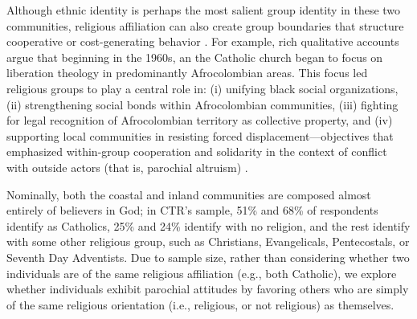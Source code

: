 \documentclass[bibauthoryear]{aa}
\begin{document}
Although ethnic identity is perhaps the most salient group identity in these two communities, religious affiliation can also create group boundaries that  structure cooperative or cost-generating behavior  \citep[e.g.,][]{lang2019moralizing, purzycki2016moralistic, hruschka2014impartial}. For example, rich qualitative accounts \citep[e.g.,][]{oyola2015religion} argue that beginning in the 1960s, an the Catholic church began to focus on liberation theology in predominantly Afrocolombian areas. This focus led religious groups to play a central role in: (i) unifying black social organizations,  (ii) strengthening social bonds within Afrocolombian communities, (iii) fighting for legal recognition of Afrocolombian territory as collective property, and (iv) supporting local communities in resisting forced displacement---objectives that emphasized within-group cooperation and solidarity in the context of conflict with outside actors (that is, parochial altruism) \citep{oyola2017local}.

Nominally, both the coastal and inland communities are composed almost entirely of believers in God; in CTR's sample, 51\% and 68\% of respondents identify as Catholics, 25\% and 24\% identify with no religion, and the rest identify with some other religious group, such as Christians, Evangelicals, Pentecostals, or Seventh Day Adventists. Due to sample size, rather than considering whether two individuals are of the same religious affiliation (e.g., both Catholic), we explore whether individuals exhibit parochial attitudes by favoring others who are simply of the same religious orientation (i.e., religious, or not religious) as themselves.
\end{document}
